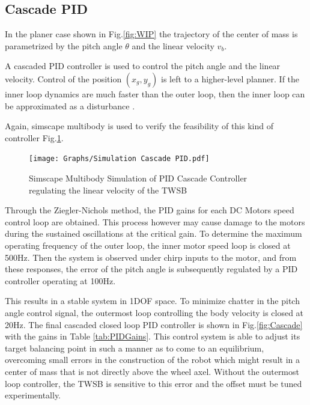         \subsection{Cascade PID}
                
        In the planer case shown in Fig.\ref{fig:WIP} the trajectory of the center of mass is parametrized by 
        the pitch angle $\theta$ and the linear velocity $v_b$. 
            
        A cascaded PID controller is used to control the pitch angle and the linear velocity. 
        Control of the position $(x_g,y_g)$ is left to a higher-level planner.  
        If the inner loop dynamics are much faster than the outer loop, 
        then the inner loop can be approximated as a disturbance \cite{Robust2DofPID}.

        Again, simscape multibody is used to verify the feasibility of this kind of controller Fig.\ref{fig:SimPID}.

        \begin{figure}[H]
            \centering
            \texttt{[image: Graphs/Simulation Cascade PID.pdf]}
            \caption{Simscape Multibody Simulation of PID Cascade Controller regulating the linear velocity of the TWSB}
            \label{fig:SimPID}
        \end{figure}

        Through the Ziegler-Nichols method, the PID gains for each DC Motors speed control loop 
        are obtained. This process however may cause damage to the motors 
        during the sustained oscillations at the critical gain. 
        To determine the maximum operating frequency of the outer loop, 
        the inner motor speed loop is closed at 500Hz. Then the system is observed under chirp inputs to the motor, and from 
        these responses, the error of the pitch angle is subsequently regulated by a PID controller operating at 100Hz.
       
        This results in a stable system in 1DOF space. To minimize chatter in the pitch angle control signal, the outermost 
        loop controlling the body velocity is closed at 20Hz.
        The final cascaded closed loop PID controller is shown in Fig.\ref{fig:Cascade} with the gains in Table \ref{tab:PIDGains}. 
        This control system is able to adjust its target balancing point in such a manner as to come to an equilibrium, overcoming small 
        errors in the construction of the robot which might result in a center of mass that is not directly above the wheel axel. 
        Without the outermost loop controller, the TWSB is sensitive to this error and the offset must be tuned experimentally.
       

